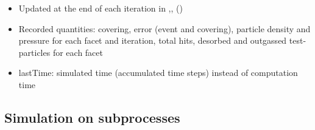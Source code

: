 \begin{itemize}[noitemsep,topsep=0pt, partopsep=0pt]
\item Updated at the end of each iteration in ,\linebreak[4] ,  ()
\item Recorded quantities: covering, error (event and covering), particle density and pressure for each facet and  iteration, total hits, desorbed and outgassed test-particles for each facet
\item lastTime: simulated time (accumulated time steps) instead of computation time 
\end{itemize}

 \subsection{Simulation on subprocesses}
